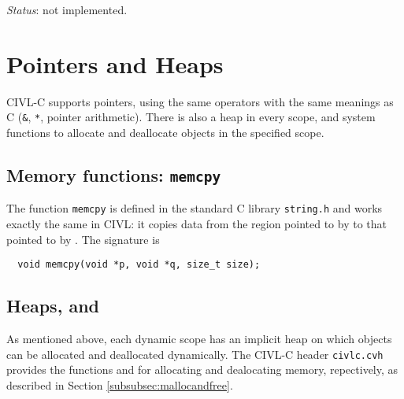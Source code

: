 \emph{Status}: not implemented.

\chapter{Pointers and Heaps}
\label{chap:pointers}

CIVL-C supports pointers, using the same operators with the same
meanings as C (\texttt{\&}, \texttt{*}, pointer arithmetic).  There is
also a heap in every scope, and system functions to allocate and
deallocate objects in the specified scope.

\section{Memory functions: \texttt{memcpy}}

The function \texttt{memcpy} is defined in the standard C library
\texttt{string.h} and works exactly the same in CIVL: it copies
data from the region pointed to by  to that pointed to by
.  The signature is

\begin{verbatim}
  void memcpy(void *p, void *q, size_t size);
\end{verbatim}

\section{Heaps, \cmalloc{} and \cfree}

As mentioned above, each dynamic scope has an implicit heap on which
objects can be allocated and deallocated dynamically.  The CIVL-C header
\texttt{civlc.cvh} provides the functions \cmalloc{} and \cfree{} for allocating and dealocating
memory, repectively, as described in Section \ref{subsubsec:mallocandfree}.




